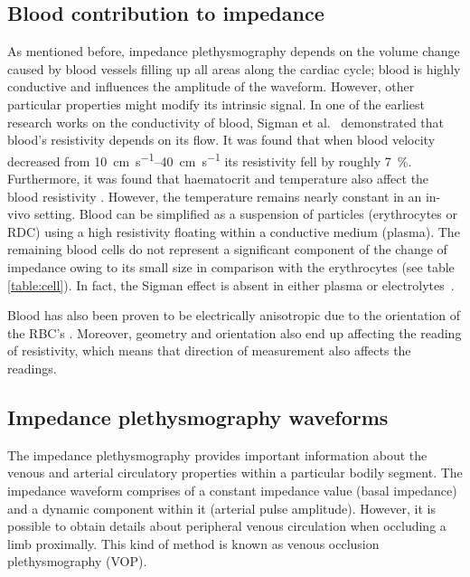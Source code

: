 \subsection{Blood contribution to impedance} %
As mentioned before, impedance plethysmography depends on the volume change caused by blood vessels filling up all areas along the cardiac cycle; blood is highly conductive and influences the amplitude of the waveform. However, other particular properties might modify its intrinsic signal. In one of the earliest research works on the conductivity of blood, Sigman et al.~\cite{sigman1937effect} demonstrated that blood's resistivity depends on its flow. It was found that when blood velocity decreased from \SIrange{10}{40}{\centi\meter\per\second} its resistivity fell by roughly \SI{7}{\percent}. Furthermore, it was found that haematocrit and temperature also affect the blood resistivity \cite{yamakoshi1980noninvasive}. However, the temperature remains nearly constant in an in-vivo setting. Blood can be simplified as a suspension of particles (erythrocytes or RDC) using a high resistivity floating within a conductive medium (plasma). The remaining blood cells do not represent a significant component of the change of impedance owing to its small size in comparison with the erythrocytes (see table \ref{table:cell}). In fact, the Sigman effect is absent in either plasma or electrolytes~\cite{tremper1990principles}.  

Blood has also been proven to be electrically anisotropic due to the orientation of the RBC's \cite{Visser1992Electric}. Moreover, geometry and orientation also end up affecting the reading of resistivity, which means that direction of measurement also affects the readings. 

\subsection{Impedance plethysmography waveforms}
\label{section iPG waveforms}
The impedance plethysmography provides important information about the venous and arterial circulatory properties within a particular bodily segment. The impedance waveform comprises of a constant impedance value (basal impedance) and a dynamic component within it (arterial pulse amplitude). However, it is possible to obtain details about peripheral venous circulation when occluding a limb proximally. This kind of method is known as venous occlusion plethysmography (VOP).

